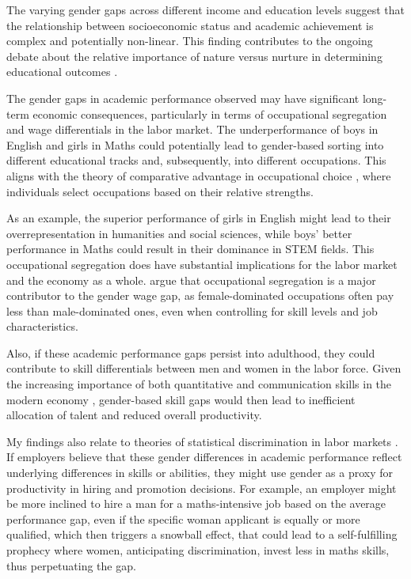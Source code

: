\documentclass[12pt,a4paper,onecolumn]{article}
\numberwithin{equation}{section}
\begin{document}
The varying gender gaps across different income and education levels suggest that the relationship between socioeconomic status and academic achievement is complex and potentially non-linear. This finding contributes to the ongoing debate about the relative importance of nature versus nurture in determining educational outcomes \parencite{sacerdote2011nature}.

The gender gaps in academic performance observed may have significant long-term economic consequences, particularly in terms of occupational segregation and wage differentials in the labor market. The underperformance of boys in English and girls in Maths could potentially lead to gender-based sorting into different educational tracks and, subsequently, into different occupations. This aligns with the theory of comparative advantage in occupational choice \parencite{rosen1978substitution}, where individuals select occupations based on their relative strengths.

As an example, the superior performance of girls in English might lead to their overrepresentation in humanities and social sciences, while boys' better performance in Maths could result in their dominance in STEM fields. This occupational segregation does have substantial implications for the labor market and the economy as a whole. \textcite{blau2017gender} argue that occupational segregation is a major contributor to the gender wage gap, as female-dominated occupations often pay less than male-dominated ones, even when controlling for skill levels and job characteristics.

Also, if these academic performance gaps persist into adulthood, they could contribute to skill differentials between men and women in the labor force. Given the increasing importance of both quantitative and communication skills in the modern economy \parencite{deming2017growing}, gender-based skill gaps would then lead to inefficient allocation of talent and reduced overall productivity.

My findings also relate to theories of statistical discrimination in labor markets \parencite{phelps1972statistical}. If employers believe that these gender differences in academic performance reflect underlying differences in skills or abilities, they might use gender as a proxy for productivity in hiring and promotion decisions. For example, an employer might be more inclined to hire a man for a maths-intensive job based on the average performance gap, even if the specific woman applicant is equally or more qualified, which then triggers a snowball effect, that could lead to a self-fulfilling prophecy where women, anticipating discrimination, invest less in maths skills, thus perpetuating the gap.
\end{document}
